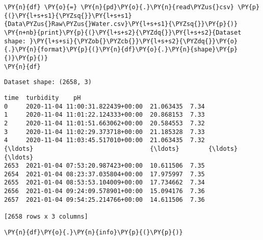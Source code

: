     \begin{tcolorbox}[breakable, size=fbox, boxrule=1pt, pad at break*=1mm,colback=cellbackground, colframe=cellborder]
\begin{Verbatim}[commandchars=\\\{\}]
\PY{n}{df} \PY{o}{=} \PY{n}{pd}\PY{o}{.}\PY{n}{read\PYZus{}csv} \PY{p}{(}\PY{l+s+s1}{\PYZsq{}}\PY{l+s+s1}{Data\PYZus{}Raw\PYZus{}Water.csv}\PY{l+s+s1}{\PYZsq{}}\PY{p}{)}
\PY{n+nb}{print}\PY{p}{(}\PY{l+s+s2}{\PYZdq{}}\PY{l+s+s2}{Dataset shape: }\PY{l+s+si}{\PYZob{}\PYZcb{}}\PY{l+s+s2}{\PYZdq{}}\PY{o}{.}\PY{n}{format}\PY{p}{(}\PY{n}{df}\PY{o}{.}\PY{n}{shape}\PY{p}{)}\PY{p}{)}
\PY{n}{df}
\end{Verbatim}
\end{tcolorbox}

    \begin{Verbatim}[commandchars=\\\{\}]
Dataset shape: (2658, 3)
    \end{Verbatim}

            \begin{tcolorbox}[breakable, size=fbox, boxrule=.5pt, pad at break*=1mm, opacityfill=0]
\begin{Verbatim}[commandchars=\\\{\}]
                                  time  turbidity    pH
0     2020-11-04 11:00:31.822439+00:00  21.063435  7.34
1     2020-11-04 11:01:22.124333+00:00  20.868153  7.33
2     2020-11-04 11:01:51.663062+00:00  20.584553  7.32
3     2020-11-04 11:02:29.373718+00:00  21.185328  7.33
4     2020-11-04 11:03:45.517010+00:00  21.063435  7.32
{\ldots}                                {\ldots}        {\ldots}   {\ldots}
2653  2021-01-04 07:53:20.987423+00:00  10.611506  7.35
2654  2021-01-04 08:23:37.035804+00:00  17.975997  7.35
2655  2021-01-04 08:53:53.104009+00:00  17.734662  7.34
2656  2021-01-04 09:24:09.578901+00:00  15.094176  7.36
2657  2021-01-04 09:54:25.214766+00:00  14.611506  7.36

[2658 rows x 3 columns]
\end{Verbatim}
\end{tcolorbox}
        
    \begin{tcolorbox}[breakable, size=fbox, boxrule=1pt, pad at break*=1mm,colback=cellbackground, colframe=cellborder]
\begin{Verbatim}[commandchars=\\\{\}]
\PY{n}{df}\PY{o}{.}\PY{n}{info}\PY{p}{(}\PY{p}{)}
\end{Verbatim}
\end{tcolorbox}

